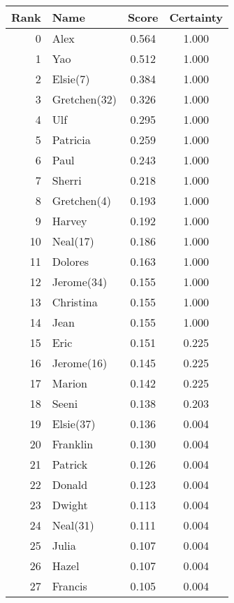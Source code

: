 \documentclass{icmmcm}
\begin{document}
\twocolumn
\begin{table}[h!]
\begin{center}
\begin{tabular}{|@{}r@{}||l|c|@{}c@{}|} 
\toprule
 Rank 	&     Name    	&Score    &Certainty \\ 
\midrule   
\hline
0    	&Alex         	& 0.564	&    1.000\\
1    	&Yao          	& 0.512	&    1.000\\
2    	&Elsie(7)     	& 0.384	&    1.000\\
3    	&Gretchen(32) 	& 0.326	&    1.000\\
4    	&Ulf          	& 0.295	&    1.000\\
5    	&Patricia     	& 0.259	&    1.000\\
6    	&Paul         	& 0.243	&    1.000\\
7    	&Sherri       	& 0.218	&    1.000\\
8    	&Gretchen(4)  	& 0.193	&    1.000\\
9    	&Harvey       	& 0.192	&    1.000\\
10   	&Neal(17)     	& 0.186	&    1.000\\
11   	&Dolores      	& 0.163	&    1.000\\
12   	&Jerome(34)   	& 0.155	&    1.000\\
13   	&Christina    	& 0.155	&    1.000\\
14   	&Jean         	& 0.155	&    1.000\\
15   	&Eric         	& 0.151	&    0.225\\
16   	&Jerome(16)   	& 0.145	&    0.225\\
17   	&Marion       	& 0.142	&    0.225\\
18   	&Seeni        	& 0.138	&    0.203\\
19   	&Elsie(37)    	& 0.136	&    0.004\\
20   	&Franklin     	& 0.130	&    0.004\\
21   	&Patrick      	& 0.126	&    0.004\\
22   	&Donald       	& 0.123	&    0.004\\
23   	&Dwight       	& 0.113	&    0.004\\
24   	&Neal(31)     	& 0.111	&    0.004\\
25   	&Julia        	& 0.107	&    0.004\\
26   	&Hazel        	& 0.107	&    0.004\\
27   	&Francis      	& 0.105	&    0.004\\

\end{tabular}
\end{center}
\end{table}
\end{document}
